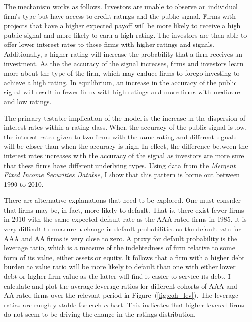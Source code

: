\documentclass[notitlepage]{article}
\begin{document}
The mechanism works as follows. Investors are unable to observe an individual firm's type but have access to credit ratings and the public signal. Firms with projects that have a higher expected payoff will be more likely to receive a high public signal and more likely to earn a high rating. The investors are then able to offer lower interest rates to those firms with higher ratings and signals. Additionally, a higher rating will increase the probability that a firm receives an investment. As the the accuracy of the signal increases, firms and investors learn more about the type of the firm, which may enduce firms to forego investing to achieve a high rating. In equilibrium, an increase in the accuracy of the public signal will result in fewer firms with high ratings and more firms with mediocre and low ratings.

The primary testable implication of the model is the increase in the dispersion of interest rates within a rating class. When the accuracy of the public signal is low, the interest rates given to two firms with the same rating and different signals will be closer than when the accuracy is high. In effect, the difference between the interest rates increases with the accuracy of the signal as investors are more sure that these firms have different underlying types. Using data from the \textit{Mergent Fixed Income Securities Databse}, I show that this pattern is borne out between 1990 to 2010. 


There are alternative explanations that need to be explored. One must consider that firms may be, in fact, more likely to default. That is, there exist fewer firms in 2010 with the same expected default rate as the AAA rated firms in 1985. It is very difficult to measure a change in default probabilities as the default rate for AAA and AA firms is very close to zero. A proxy for default probability is the leverage ratio, which is a measure of the indebtedness of firm relative to some form of its value, either assets or equity. It follows that a firm with a higher debt burden to value ratio will be more likely to default than one with either lower debt or higher firm value as the latter will find it easier to service its debt. I calculate and plot the average leverage ratios for different cohorts of AAA and AA rated firms over the relevant period in Figure~(\ref{fig:coh_lev}). The leverage ratios are roughly stable for each cohort. This indicates that higher levered firms do not seem to be driving the change in the ratings distribution.
\end{document}
